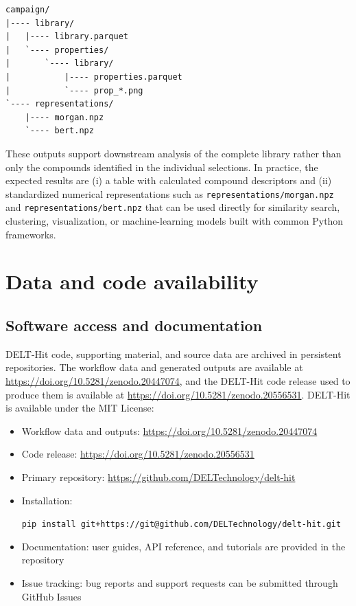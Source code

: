 \documentclass[pdflatex,sn-nature]{sn-jnl}
\begin{document}
\begin{lstlisting}
campaign/
|---- library/
|   |---- library.parquet
|   `---- properties/
|       `---- library/
|           |---- properties.parquet
|           `---- prop_*.png
`---- representations/
    |---- morgan.npz
    `---- bert.npz
\end{lstlisting}

These outputs support downstream analysis of the complete library rather than only the compounds identified in the individual selections. In practice, the expected results are (i) a table with calculated compound descriptors and (ii) standardized numerical representations such as \texttt{representations/morgan.npz} and \texttt{representations/bert.npz} that can be used directly for similarity search, clustering, visualization, or machine-learning models built with common Python frameworks.

\section{Data and code availability}

\subsection{Software access and documentation}
DELT-Hit code, supporting material, and source data are archived in persistent repositories. The workflow data and generated outputs are available at \url{https://doi.org/10.5281/zenodo.20447074}, and the DELT-Hit code release used to produce them is available at \url{https://doi.org/10.5281/zenodo.20556531}. DELT-Hit is available under the MIT License:

\begin{itemize}
  \item Workflow data and outputs: \url{https://doi.org/10.5281/zenodo.20447074}
  \item Code release: \url{https://doi.org/10.5281/zenodo.20556531}
  \item Primary repository: \url{https://github.com/DELTechnology/delt-hit}
  \item Installation: {\sloppy\texttt{pip install git+https://git@github.com/DELTechnology/delt-hit.git}\par}
  \item Documentation: user guides, API reference, and tutorials are provided in the repository
  \item Issue tracking: bug reports and support requests can be submitted through GitHub Issues
\end{itemize}
\end{document}
